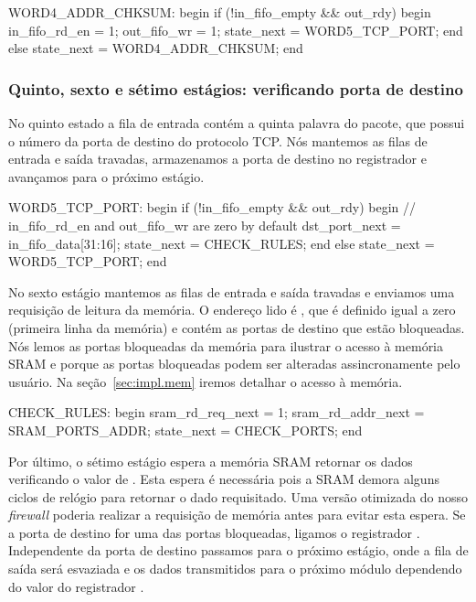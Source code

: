 \begin{verilogcode}
  WORD4_ADDR_CHKSUM: begin
     if (!in_fifo_empty && out_rdy) begin
        in_fifo_rd_en = 1;
        out_fifo_wr = 1;
        state_next = WORD5_TCP_PORT;
     end
     else
        state_next = WORD4_ADDR_CHKSUM;
  end
\end{verilogcode}

\subsubsection*{Quinto, sexto e sétimo estágios: verificando porta de
destino}

No quinto estado a fila de entrada contém a quinta palavra do
pacote, que possui o número da porta de destino do protocolo TCP.
Nós mantemos as filas de entrada e saída travadas, armazenamos a
porta de destino no registrador  e avançamos para o
próximo estágio.

\begin{verilogcode}
  WORD5_TCP_PORT: begin
     if (!in_fifo_empty && out_rdy) begin
        // in_fifo_rd_en and out_fifo_wr are zero by default
        dst_port_next = in_fifo_data[31:16];
        state_next = CHECK_RULES;
     end
     else
        state_next = WORD5_TCP_PORT;
  end
\end{verilogcode}

No sexto estágio mantemos as filas de entrada e saída travadas e
enviamos uma requisição de leitura da memória.  O endereço lido é
, que é definido igual a zero (primeira linha
da memória) e contém as portas de destino que estão bloqueadas.  Nós
lemos as portas bloqueadas da memória para ilustrar o acesso à
memória SRAM e porque as portas bloqueadas podem ser alteradas
assincronamente pelo usuário.  Na seção~\ref{sec:impl.mem} iremos
detalhar o acesso à memória.

\begin{verilogcode}
  CHECK_RULES: begin
     sram_rd_req_next = 1;
     sram_rd_addr_next = SRAM_PORTS_ADDR;
     state_next = CHECK_PORTS;
  end
\end{verilogcode}

Por último, o sétimo estágio espera a memória SRAM retornar os dados
verificando o valor de .  Esta espera é necessária pois
a SRAM demora alguns ciclos de relógio para retornar o dado
requisitado.  Uma versão otimizada do nosso \emph{firewall} poderia
realizar a requisição de memória antes para evitar esta espera.  Se
a porta de destino for uma das portas bloqueadas, ligamos o
registrador .  Independente da porta de destino passamos
para o próximo estágio, onde a fila de saída será esvaziada e os
dados transmitidos para o próximo módulo dependendo do valor do
registrador .

